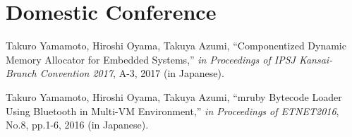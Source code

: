 \documentclass[a4j,12pt,oneside,openany,english]{jsbook}
\begin{document}
\section*{Domestic Conference}
\begin{enumerate}[{[}1{]}]
\item
    Takuro Yamamoto, Hiroshi Oyama, Takuya Azumi,
    ``Componentized Dynamic Memory Allocator for Embedded Systems,''
    \emph{in Proceedings of IPSJ Kansai-Branch Convention 2017},
    A-3, 2017 (in Japanese).
\item
    Takuro Yamamoto, Hiroshi Oyama, Takuya Azumi,
    ``mruby Bytecode Loader Using Bluetooth in Multi-VM Environment,''
    \emph{in Proceedings of ETNET2016},
    No.8, pp.1-6, 2016 (in Japanese).
\end{enumerate}
\end{document}
